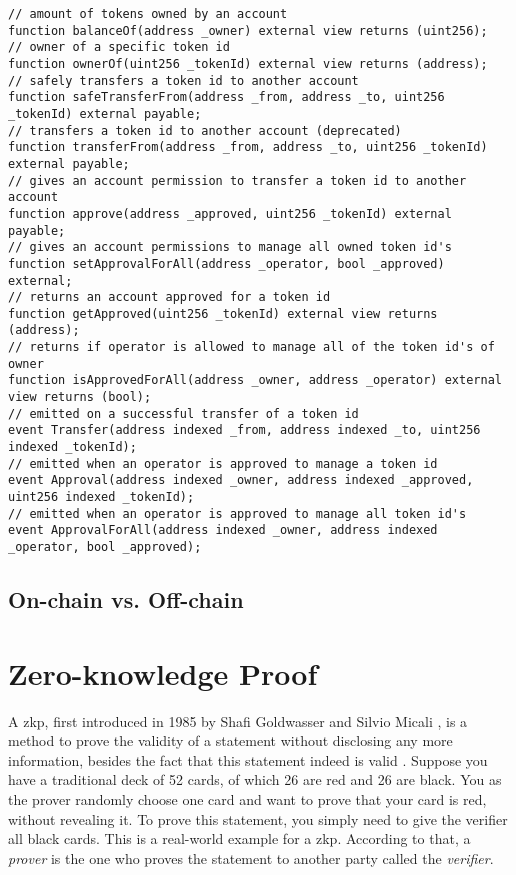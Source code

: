 \begin{lstlisting}[language=Solidity,caption={Core interface of an ERC-721 compliant token},label={lst:erc721-implementation}]
// amount of tokens owned by an account
function balanceOf(address _owner) external view returns (uint256);
// owner of a specific token id
function ownerOf(uint256 _tokenId) external view returns (address);
// safely transfers a token id to another account
function safeTransferFrom(address _from, address _to, uint256 _tokenId) external payable;
// transfers a token id to another account (deprecated)
function transferFrom(address _from, address _to, uint256 _tokenId) external payable;
// gives an account permission to transfer a token id to another account
function approve(address _approved, uint256 _tokenId) external payable;
// gives an account permissions to manage all owned token id's
function setApprovalForAll(address _operator, bool _approved) external;
// returns an account approved for a token id
function getApproved(uint256 _tokenId) external view returns (address);
// returns if operator is allowed to manage all of the token id's of owner 
function isApprovedForAll(address _owner, address _operator) external view returns (bool);
// emitted on a successful transfer of a token id
event Transfer(address indexed _from, address indexed _to, uint256 indexed _tokenId);
// emitted when an operator is approved to manage a token id
event Approval(address indexed _owner, address indexed _approved, uint256 indexed _tokenId);
// emitted when an operator is approved to manage all token id's
event ApprovalForAll(address indexed _owner, address indexed _operator, bool _approved);
\end{lstlisting}

\subsection{On-chain vs. Off-chain}
\label{subsec:onoff}

\section{Zero-knowledge Proof}
\label{sec:zkp}

A \acrfull{zkp}, first introduced in 1985 by Shafi Goldwasser and Silvio Micali \cite{doi:10.1137/0218012}, is a method to prove the validity of a statement without disclosing any more information, besides the fact that this statement indeed is valid \cite{simunicVerifiableComputingApplications2021}. Suppose you have a traditional deck of 52 cards, of which 26 are red and 26 are black. You as the prover randomly choose one card and want to prove that your card is red, without revealing it. To prove this statement, you simply need to give the verifier all black cards. This is a real-world example for a \acrshort{zkp}. According to that, a \emph{prover} is the one who proves the statement to another party called the \emph{verifier}.

